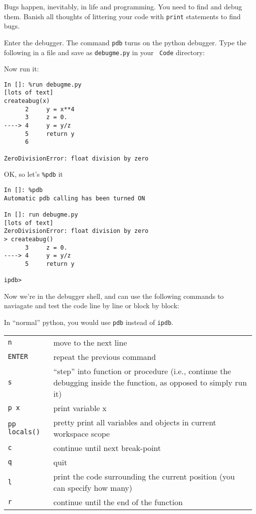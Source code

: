 Bugs happen, inevitably, in life and programming. You need to find and 
debug them. Banish all thoughts of littering your code with {\tt print} 
statements to find bugs. 

Enter the debugger. The command {\tt pdb} turns on the python debugger. 
Type the following in a file and save as {\tt debugme.py} in your {\tt 
Code} directory: 



Now run it:
 
   \begin{lstlisting}
In []: %run debugme.py
[lots of text]
createabug(x)
      2     y = x**4
      3     z = 0.
----> 4     y = y/z
      5     return y
      6 

ZeroDivisionError: float division by zero
  \end{lstlisting}

OK, so let's {\tt \%pdb} it
 
\begin{lstlisting}
In []: %pdb
Automatic pdb calling has been turned ON

In []: run debugme.py
[lots of text]
ZeroDivisionError: float division by zero
> createabug()
      3     z = 0.
----> 4     y = y/z
      5     return y

ipdb> 
\end{lstlisting}

Now we're in the debugger shell, and can use the following commands to 
naviagate and test the code line by line or block by block:

\begin{tipbox}
	In ``normal'' python, you would use {\tt pdb} instead of {\tt ipdb}.
\end{tipbox}

\begin{tabular}{p{1.5cm} p{11cm}} 
	{\tt n} 		& move to the next line\\
	{\tt ENTER} & repeat the previous command\\
	{\tt s} 		& ``step'' into function or procedure (i.e., continue
	  the debugging inside the function, as opposed to simply run it)\\
	{\tt p x} 	& print variable x\\
	{\tt pp locals()} 	& pretty print all variables and objects in current 
	workspace scope\\
	{\tt c} 		& continue until next break-point\\
	{\tt q} 		& quit\\
	{\tt l} 		& print the code surrounding the current position (you can
	specify how many)\\
	{\tt r} 		& continue until the end of the function\\
\end{tabular}\\


